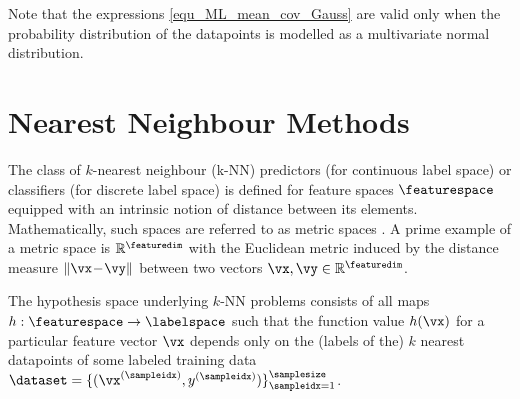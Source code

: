 \documentclass[12pt]{report}
\begin{document}
Note that the expressions \eqref{equ_ML_mean_cov_Gauss} 
are valid only when the probability distribution of the datapoints is 
modelled as a multivariate normal distribution. 

\section{Nearest Neighbour Methods} 
The class of $k$-nearest neighbour (k-NN) predictors (for continuous label space) or 
classifiers (for discrete label space) is defined for feature spaces $\featurespace$ equipped 
with an intrinsic notion of distance between its elements. Mathematically, such spaces are 
referred to as metric spaces \cite{RudinBookPrinciplesMatheAnalysis}. A prime example of a 
metric space is $\mathbb{R}^{\featuredim}$ with the Euclidean metric induced by the distance 
measure $\| \vx\!-\!\vy \|$ between two vectors $\vx, \vy \in \mathbb{R}^{\featuredim}$. 

The hypothesis space underlying $k$-NN problems consists of all maps $h: \featurespace \rightarrow \labelspace$ 
such that the function value $h(\vx)$ for a particular feature vector $\vx$ depends only on the (labels of the) $k$ 
nearest datapoints of some labeled training data $\dataset = \{ (\vx^{(\sampleidx)},y^{(\sampleidx)}) \}_{\sampleidx=1}^{\samplesize}$. 
\end{document}
